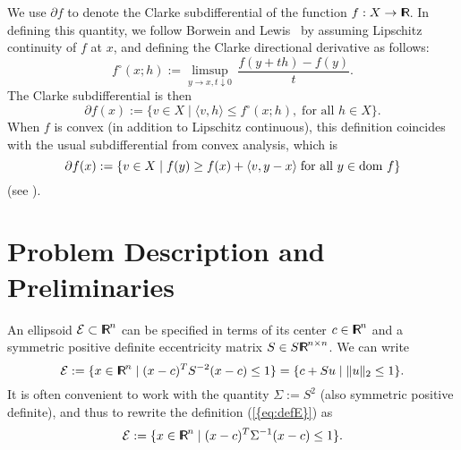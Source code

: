 \documentclass{siamltex}
\providecommand{\norm}[1]{\lVert#1\rVert}
\begin{document}
We use $\partial f$ to denote the Clarke subdifferential of the
function $f: X \to {\makebox{\sf I \hspace{-8.5 pt} R \hspace{-4.0pt}}}$. In defining this quantity, we follow Borwein
and Lewis~\cite[p.~124]{BorL00} by assuming Lipschitz continuity of
$f$ at $x$, and defining the Clarke directional derivative as follows:
\[
f^{\circ}(x;h) := \limsup_{y \to x, t \downarrow 0} \, \frac{f(y+th)-f(y)}{t}.
\]
The Clarke subdifferential is then
\begin{equation} \label{def:clarke.sub}
\partial f(x) := \{ v \in X \mid \langle v,h \rangle \le f^{\circ} (x;h), \;
\mbox{for all $h \in X$} \}.
\end{equation}
When $f$ is convex (in addition to Lipschitz continuous), this
definition coincides with the usual subdifferential from convex
analysis, which is 
\[
\partial f(x) := \{ v \in X \mid f(y) \ge f(x) + \langle v,y-x \rangle \;
\mbox{for all $y \in {\mbox{\rm dom }} f$} \}
\]
(see \cite[Proposition~2.2.7]{Cla83}).

\section{Problem Description and Preliminaries} \label{sec:prob}

An ellipsoid $\mathcal{E} \subset {\makebox{\sf I \hspace{-8.5 pt} R \hspace{-4.0pt}}}^n$ can be specified in terms of
its center $c \in {\makebox{\sf I \hspace{-8.5 pt} R \hspace{-4.0pt}}}^n$ and a symmetric positive definite eccentricity
matrix $S \in S {\makebox{\sf I \hspace{-8.5 pt} R \hspace{-4.0pt}}}^{n \times n}$. We can write
\begin{equation} \label{eq:defE}
\mathcal{E}  := \{x\in{\makebox{\sf I \hspace{-8.5 pt} R \hspace{-4.0pt}}}^n \mid (x-c)^T S^{-2} (x-c)\leq 1 \}  =
\{ c + S u \mid \norm{u}_2 \le 1 \}.
\end{equation}
It is often convenient to work with the quantity $\Sigma := S^2$ (also
symmetric positive definite), and thus to rewrite the definition
{(\ref{{eq:defE}})} as
\begin{equation} \label{eq:defSig,gen}
\mathcal{E}  := \{x\in{\makebox{\sf I \hspace{-8.5 pt} R \hspace{-4.0pt}}}^n \mid (x-c)^T \Sigma^{-1} (x-c)\leq 1 \}.
\end{equation}
\end{document}
